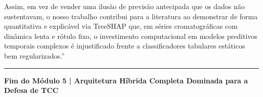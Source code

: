 \documentclass[11pt,a4paper]{article}
\begin{document}
Assim, em vez de vender uma ilusão de previsão antecipada que os dados não sustentavam, o nosso trabalho contribui para a literatura ao demonstrar de forma quantitativa e explicável via TreeSHAP que, em séries cromatográficas com dinâmica lenta e rótulo fixo, o investimento computacional em modelos preditivos temporais complexos é injustificado frente a classificadores tabulares estáticos bem regularizados.''\vspace{0.4cm}

\noindent\rule{\textwidth}{1.2pt}
\begin{center}
  \small\textbf{\textsf{\color{NavyBlue}Fim do Módulo 5 | Arquitetura Híbrida Completa Dominada para a Defesa de TCC}}
\end{center}
\end{document}
